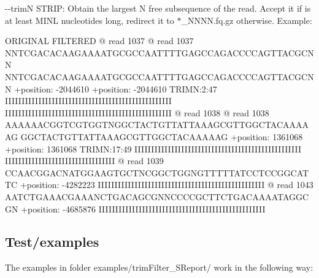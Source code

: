 \begin{DoxyItemize}
\item {\ttfamily -\/-\/trimN S\+T\+R\+IP}\+: Obtain the largest N free subsequence of the read. Accept it if is at least M\+I\+NL nucleotides long, redirect it to {\ttfamily $\ast$\+\_\+\+N\+N\+NN.fq.\+gz} otherwise. Example\+: 
\begin{DoxyCode}
ORIGINAL                                           FILTERED
@ read 1037                                        @ read 1037
NNTCGACACAAGAAAATGCGCCAATTTTGAGCCAGACCCCAGTTACGCNN NNTCGACACAAGAAAATGCGCCAATTTTGAGCCAGACCCCAGTTACGCNN
+position: -2044610                                +position: -2044610  TRIMN:2:47
IIIIIIIIIIIIIIIIIIIIIIIIIIIIIIIIIIIIIIIIIIIIIIIIII IIIIIIIIIIIIIIIIIIIIIIIIIIIIIIIIIIIIIIIIIIIIIIIIII
@ read 1038                                        @ read 1038
AAAAAACGGTCGTGGTNGGCTACTGTTATTAAAGCGTTGGCTACAAAAAG GGCTACTGTTATTAAAGCGTTGGCTACAAAAAG
+position: 1361068                                 +position: 1361068  TRIMN:17:49
IIIIIIIIIIIIIIIIIIIIIIIIIIIIIIIIIIIIIIIIIIIIIIIIII IIIIIIIIIIIIIIIIIIIIIIIIIIIIIIIII
@ read 1039
CCAACGGACNATGGAAGTGCTNCGGCTGGNGTTTTTATCCTCCGGCATTC
+position: -4282223
IIIIIIIIIIIIIIIIIIIIIIIIIIIIIIIIIIIIIIIIIIIIIIIIII
@ read 1043
AATCTGAAACGAAANCTGACAGCGNNCCCCGCTTCTGACAAAATAGGCGN
+position: -4685876
IIIIIIIIIIIIIIIIIIIIIIIIIIIIIIIIIIIIIIIIIIIIIIIIII
\end{DoxyCode}

\end{DoxyItemize}

\subsection*{Test/examples}

The examples in folder {\ttfamily examples/trim\+Filter\+\_\+\+S\+Report/} work in the following way\+:


